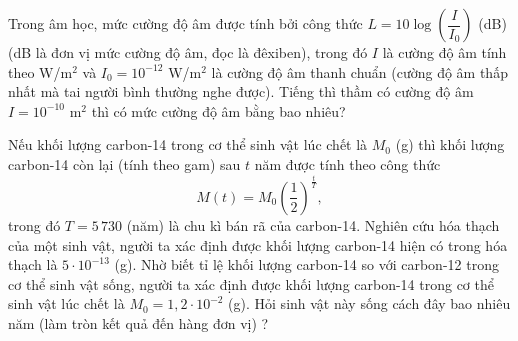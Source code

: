 \begin{bt}%
Trong âm học, mức cường độ âm được tính bởi công thức $ L=10\log\left(\dfrac{I}{I_0}\right)$ (dB) (dB là đơn vị mức cường độ âm, đọc là đêxiben), trong đó $I$ là cường độ âm tính theo  W/m$^2$ và $I_0=10^{-12}$ W/m$^2$ là cường độ âm thanh chuẩn (cường độ âm thấp nhất mà tai người bình thường nghe được). Tiếng thì thầm có cường độ âm $ I=10^{-10}$ m$^2$ thì có mức cường độ âm bằng bao nhiêu?
\end{bt}

\begin{bt}%
Nếu khối lượng carbon-14 trong cơ thể sinh vật lúc chết là $M_0$ (g) thì khối lượng carbon-14 còn lại (tính theo gam) sau $t$ năm được tính theo công thức
\[M(t)=M_0\left(\dfrac{1}{2}\right)^{\tfrac{t}{T}},
\]
trong đó $T=5\,730$ (năm) là chu kì bán rã của carbon-14. Nghiên cứu hóa thạch của một sinh vật, người ta xác định được khối lượng carbon-14 hiện có trong hóa thạch là $5\cdot 10^{-13}$ (g).
Nhờ biết tỉ lệ khối lượng carbon-14 so với carbon-12 trong cơ thể sinh vật sống, người ta xác định được khối lượng carbon-14 trong cơ thể sinh vật lúc chết là $M_0=1{,}2\cdot 10^{-2}$ (g). Hỏi sinh vật này sống cách đây bao nhiêu năm (làm tròn kết quả đến hàng đơn vị) ?
\par
{}
\end{bt}

